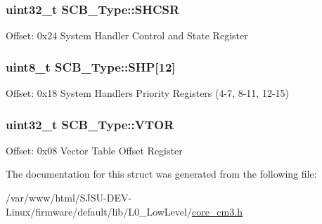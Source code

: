 \subsubsection[{\texorpdfstring{S\+H\+C\+SR}{SHCSR}}]{ uint32\+\_\+t S\+C\+B\+\_\+\+Type\+::\+S\+H\+C\+SR}\hypertarget{structSCB__Type_ae9891a59abbe51b0b2067ca507ca212f}{}\label{structSCB__Type_ae9891a59abbe51b0b2067ca507ca212f}
Offset\+: 0x24 System Handler Control and State Register 
\subsubsection[{\texorpdfstring{S\+HP}{SHP}}]{ uint8\+\_\+t S\+C\+B\+\_\+\+Type\+::\+S\+HP\mbox{[}12\mbox{]}}\hypertarget{structSCB__Type_af6336103f8be0cab29de51daed5a65f4}{}\label{structSCB__Type_af6336103f8be0cab29de51daed5a65f4}
Offset\+: 0x18 System Handlers Priority Registers (4-\/7, 8-\/11, 12-\/15) 
\subsubsection[{\texorpdfstring{V\+T\+OR}{VTOR}}]{ uint32\+\_\+t S\+C\+B\+\_\+\+Type\+::\+V\+T\+OR}\hypertarget{structSCB__Type_a0faf96f964931cadfb71cfa54e051f6f}{}\label{structSCB__Type_a0faf96f964931cadfb71cfa54e051f6f}
Offset\+: 0x08 Vector Table Offset Register 

The documentation for this struct was generated from the following file\+:\begin{DoxyCompactItemize}
\item 
/var/www/html/\+S\+J\+S\+U-\/\+D\+E\+V-\/\+Linux/firmware/default/lib/\+L0\+\_\+\+Low\+Level/\hyperlink{core__cm3_8h}{core\+\_\+cm3.\+h}\end{DoxyCompactItemize}
